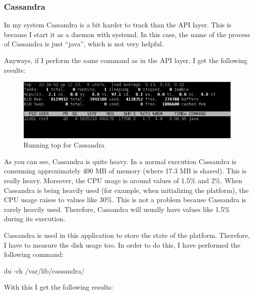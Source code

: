 \subsubsection*{Cassandra}

In my system Cassandra is a bit harder to track than the API layer. This is
because I start it as a daemon with systemd. In this case, the name of the
process of Cassandra is just ``java'', which is not very helpful.

Anyways, if I perform the same command as in the API layer, I get the following
results:

\begin{figure}[H]
  \centering
  \includegraphics[scale=0.8]{hardware/images/cassandra.png}
  \caption{Running top for Cassandra}\label{fig:top_cassandra}
\end{figure}

As you can see, Cassandra is quite heavy. In a normal execution Cassandra is
consuming approximately 400 MB of memory (where 17.3 MB is shared). This is
really heavy. Moreover, the CPU usage is around values of 1.5\% and 2\%. When
Cassandra is  being heavily used (for example, when initializing the platform),
the CPU usage raises to values like 30\%. This is not a problem because
Cassandra is rarely heavily used. Therefore, Cassandra will usually have values
like 1.5\% during its execution.

Cassandra is used in this application to store the state of the platform.
Therefore, I have to measure the disk usage too. In order to do this, I have
performed the following command:

\begin{center}
  du -ch /var/lib/cassandra/
\end{center}

With this I get the following results:

